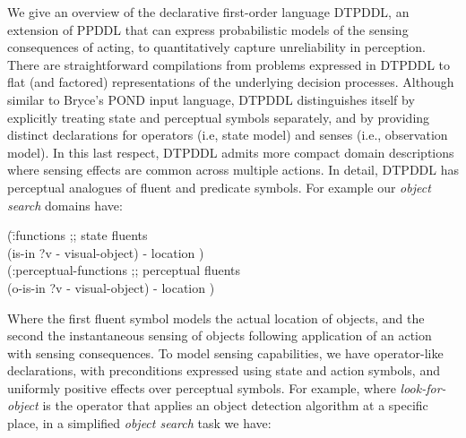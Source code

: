 







We give an overview of the declarative first-order language DTPDDL, an
extension of PPDDL that can express probabilistic models of the
sensing consequences of acting, to quantitatively capture
unreliability in perception. There are straightforward compilations
from problems expressed in DTPDDL to flat (and factored)
representations of the underlying decision processes. Although similar
to Bryce's POND input language, DTPDDL distinguishes itself by
explicitly treating state and perceptual symbols separately, and by
providing distinct declarations for operators (i.e, state model) and
senses (i.e., observation model). In this last respect, DTPDDL admits
more compact domain descriptions where sensing effects are common
across multiple actions. In detail, DTPDDL has perceptual analogues of
fluent and predicate symbols. For example our {\em object search}
domains have:

\vspace{-1ex}
\small
\begin{tabtt}
(\=:functions  ;; state fluents\\
  \> (is-in ?v - visual-object) - location )\\
(:perceptual-functions  ;; perceptual fluents\\
  \> (o-is-in ?v - visual-object) - location )
\end{tabtt}
\normalsize
\vspace{-1ex}

\noindent Where the first fluent symbol models the actual location of
objects, and the second the instantaneous sensing of objects
following application of an action with sensing consequences.
To model sensing capabilities, we have operator-like declarations,
with preconditions expressed using state and action symbols, and
uniformly positive effects over perceptual symbols. For example, where
{\em look-for-object} is the operator that applies an object detection
algorithm at a specific place, in a simplified {\em object search} task
we have:

